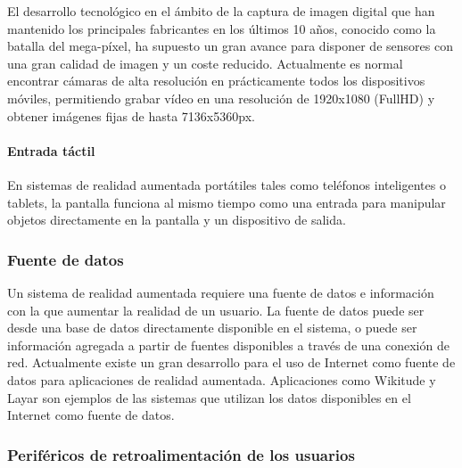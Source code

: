 El desarrollo tecnológico en el ámbito de la captura de imagen digital que han mantenido los principales fabricantes en los últimos 10 años, conocido como la batalla del mega-píxel, ha supuesto un gran avance para disponer de sensores con una gran calidad de imagen y un coste reducido. Actualmente es normal encontrar cámaras de alta resolución en prácticamente todos los dispositivos móviles, permitiendo grabar vídeo en una resolución de 1920x1080 (FullHD) y obtener imágenes fijas de hasta 7136x5360px.

\paragraph{Entrada táctil}
En sistemas de realidad aumentada portátiles tales como teléfonos inteligentes o tablets, la pantalla funciona al mismo tiempo como una entrada para manipular objetos directamente en la pantalla y un dispositivo de salida.

\subsubsection{Fuente de datos}
Un sistema de realidad aumentada requiere una fuente de datos e información con la que aumentar la realidad de un usuario. La fuente de datos puede ser desde una base de datos directamente disponible en el sistema, o puede ser información agregada a partir de fuentes disponibles a través de una conexión de red. Actualmente existe un gran desarrollo para el uso de Internet como fuente de datos para aplicaciones de realidad aumentada. Aplicaciones como Wikitude y Layar son ejemplos de las sistemas que utilizan los datos disponibles en el Internet como fuente de datos.

\subsubsection{Periféricos de retroalimentación de los usuarios}
